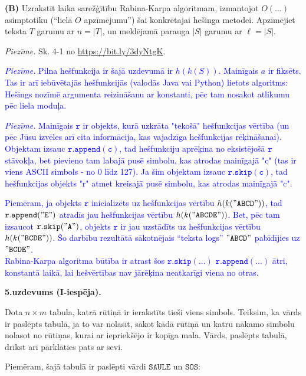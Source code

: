 \documentclass[a4paper]{article}
\begin{document}
{\bf (B)} Uzrakstīt laika sarežģītību Rabina-Karpa algoritmam, izmantojot $O(\ldots)$ asimptotiku (``lielā $O$ apzīmējumu'')
šai konkrētajai hešinga metodei. Apzīmējiet teksta $T$ garumu ar $n = |T|$, un meklējamā parauga $|S|$ garumu ar 
$\ell = |S|$. 

{\em Piezīme.} Sk. 4-1 no \url{https://bit.ly/3dyNtgK}. 

\textcolor{blue}{\small {\em Piezīme.} 
Pilna hešfunkcija ir šajā uzdevumā ir $h(k(S))$. Mainīgais $a$ ir fiksēts. 
Tas ir arī iebūvētajās hešfunkcijās (valodās Java vai Python) lietots algoritms: 
Hešings nozīmē argumenta rei\-zi\-nā\-ša\-nu ar konstanti, pēc tam nosakot atlikumu pēc liela moduļa.
}

\textcolor{blue}{\small {\em Piezīme.} 
Mainīgais $\mathtt{r}$ ir objekts, kurā uzkrāta "tekošā" hešfunkcijas vērtība 
(un pēc Jūsu izvēles arī cita informācija, kas vajadzīga hešfunkcijas rēķināšanai).
Objektam izsauc $\mathtt{r.append(c)}$, tad hešfunkciju aprēķina no eksistējošā $\mathtt{r}$ stāvokļa, 
bet pievieno tam labajā pusē simbolu, kas atrodas mainīgajā "c" (tas ir viens ASCII simbols - no 0 līdz 127). 
Ja šim objektam izsauc $\mathtt{r.skip(c)}$, tad hešfunkcijas objekts "r" atmet 
kreisajā pusē simbolu, kas atrodas mainīgajā "c".
}

\textcolor{blue}{\small
Piemēram, ja objekts $\mathtt{r}$ inicializēts uz hešfunkcijas vērtību 
$h(k(\mathtt{"ABCD"}))$, tad $\mathtt{r.append("E")}$ atradīs jau hešfunkcijas vērtību
$h(k(\mathtt{"ABCDE"}))$. Bet, pēc tam izsaucot $\mathtt{r.skip("A")}$, objekts
$\mathtt{r}$ ir jau uzstādīts uz hešfunkcijas vērtību $h(k(\mathtt{"BCDE"}))$. 
Šo darbību rezultātā sākotnējais ``teksta logs''  $\mathtt{"ABCD"}$ pabīdījies uz
$\mathtt{"BCDE"}$. \\
Rabina-Karpa algoritma būtība ir \textendash{} atrast šos 
$\mathtt{r.skip(...)}$ $\mathtt{r.append(...)}$ ātri, konstantā laikā, lai hešvērtības nav jārēķina
neatkarīgi viena no otras.
}

\vspace{10pt}
{\bf 5.uzdevums (I-iespēja).}
 
Dota $n \times m$ tabula, katrā rūtiņā ir ierakstīts
tieši viens simbols. Teiksim, ka vārds ir paslēpts tabulā, ja to var nolasīt,
sākot kādā rūtiņā un katru nākamo simbolu nolasot no rūtiņas, kurai ar
iepriekšējo ir kopīga mala. Vārds, paslēpts tabulā, drīkst arī pārklāties
pats ar sevi.

Piemēram, šajā tabulā ir paslēpti vārdi $\mathtt{SAULE}$ un $\mathtt{SOS}$:
\end{document}
